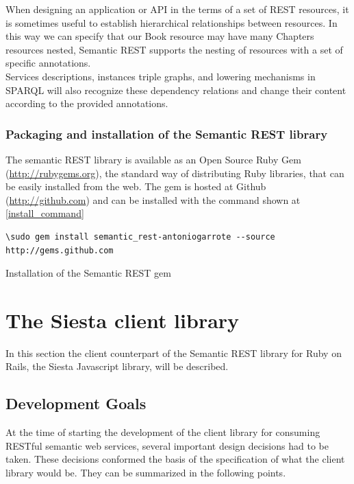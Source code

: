 When designing an application or API in the terms of a set of REST resources, it is sometimes useful to establish hierarchical
relationships between resources. In this way we can specify that our Book resource may have many Chapters resources
nested, Semantic REST supports the nesting of resources with a set of specific annotations.\\ 
Services descriptions, instances triple graphs, and lowering mechanisms in SPARQL will also recognize these dependency
relations and change their content according to the provided annotations.

\subsubsection{Packaging and installation of the Semantic REST library}

The semantic REST library is available as an Open Source Ruby Gem (\url{http://rubygems.org}), the standard way of distributing Ruby libraries, that can be
easily installed from the web. The gem is hosted at Github (\url{http://github.com}) and can be installed with the command shown at
\ref{install_command}

\begin{table}
\vspace{5 mm}
\begin{lstlisting}
\sudo gem install semantic_rest-antoniogarrote --source http://gems.github.com
\end{lstlisting} 
\vspace{5 mm}
\caption{Installation of the Semantic REST gem}
\label{install_command}
\end{table}

\section{The Siesta client library}

In this section the client counterpart of the Semantic REST library for Ruby on Rails, the Siesta Javascript library,
will be described.

\subsection{Development Goals}
At the time of starting the development of the client library for consuming RESTful semantic web services, several
important design decisions had to be taken. These decisions conformed the basis of the specification of what the
client library would be. They can be summarized in the following points.

